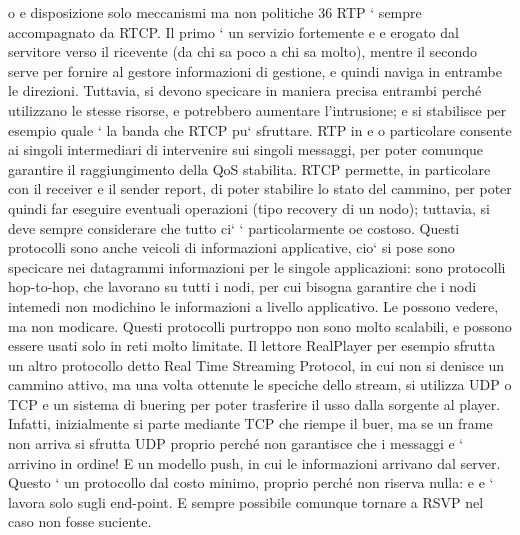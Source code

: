 \documentclass[a4paper,12pt]{article}
\begin{document}
o
e
disposizione solo meccanismi ma non politiche
36
RTP ` sempre accompagnato da RTCP. Il primo ` un servizio fortemente
e
e
erogato dal servitore verso il ricevente (da chi sa poco a chi sa molto), mentre
il secondo serve per fornire al gestore informazioni di gestione, e quindi naviga
in entrambe le direzioni. Tuttavia, si devono specicare in maniera precisa entrambi perché utilizzano le stesse risorse,
e potrebbero aumentare l'intrusione;
e
si stabilisce per esempio quale ` la banda che RTCP pu` sfruttare. RTP in
e
o
particolare consente ai singoli intermediari di intervenire sui singoli messaggi,
per poter comunque garantire il raggiungimento della QoS stabilita. RTCP permette, in particolare con il receiver e il
sender report, di poter stabilire lo stato
del cammino, per poter quindi far eseguire eventuali operazioni (tipo recovery
di un nodo); tuttavia, si deve sempre considerare che tutto ci` ` particolarmente
oe
costoso.
Questi protocolli sono anche veicoli di informazioni applicative, cio` si pose
sono specicare nei datagrammi informazioni per le singole applicazioni: sono
protocolli hop-to-hop, che lavorano su tutti i nodi, per cui bisogna garantire che
i nodi intemedi non modichino le informazioni a livello applicativo. Le possono
vedere, ma non modicare.
Questi protocolli purtroppo non sono molto scalabili, e possono essere usati
solo in reti molto limitate. Il lettore RealPlayer per esempio sfrutta un altro
protocollo detto Real Time Streaming Protocol, in cui non si denisce un cammino attivo, ma una volta ottenute le
speciche dello stream, si utilizza UDP
o TCP e un sistema di buering per poter trasferire il usso dalla sorgente al
player. Infatti, inizialmente si parte mediante TCP che riempe il buer, ma se
un frame non arriva si sfrutta UDP proprio perché non garantisce che i messaggi
e
`
arrivino in ordine! E un modello push, in cui le informazioni arrivano dal server. Questo ` un protocollo dal costo
minimo, proprio perché non riserva nulla:
e
e
`
lavora solo sugli end-point. E sempre possibile comunque tornare a RSVP nel
caso non fosse suciente.
\end{document}
